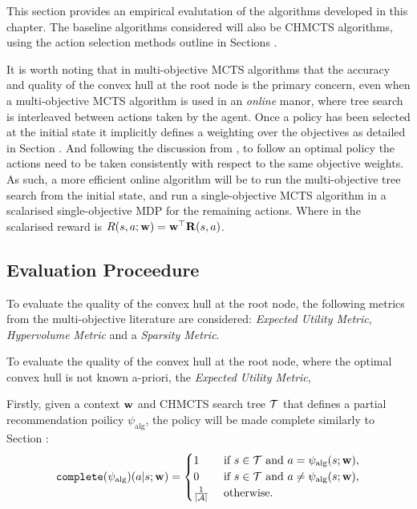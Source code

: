     This section provides an empirical evalutation of the algorithms developed in this chapter. The baseline algorithms considered will also be CHMCTS algorithms, using the action selection methods outline in Sections . 

     It is worth noting that in multi-objective MCTS algorithms that the accuracy and quality of the convex hull at the root node is the primary concern, even when a multi-objective MCTS algorithm is used in an \textit{online} manor, where tree search is interleaved between actions taken by the agent. Once a policy has been selected at the initial state it implicitly defines a weighting over the objectives as detailed in Section . And following the discussion from , to follow an optimal policy the actions need to be taken consistently with respect to the same objective weights. As such, a more efficient online algorithm will be to run the multi-objective tree search from the initial state, and run a single-objective MCTS algorithm in a scalarised single-objective MDP for the remaining actions. Where in the scalarised reward is $R(s,a;\mathbf{w}) = \mathbf{w}^\top \mathbf{R}(s,a)$.
    



    \subsection{Evaluation Proceedure} 

        To evaluate the quality of the convex hull at the root node, the following metrics from the multi-objective literature \cite{morl_survey} are considered: \textit{Expected Utility Metric}, \textit{Hypervolume Metric} and a \textit{Sparsity Metric}. 

        To evaluate the quality of the convex hull at the root node, where the optimal convex hull is not known a-priori, the \textit{Expected Utility Metric}, \textit{}

        Firstly, given a context $\mathbf{w}$ and CHMCTS search tree $\mathcal{T}$ that defines a partial recommendation poilicy $\psi_{\text{alg}}$, the policy will be made complete similarly to Section :
        \begin{align}
            \texttt{complete}(\psi_{\text{alg}})(a|s;\mathbf{w}) =
            \begin{cases}
                1                       & \text{ if } s\in\mathcal{T} \text{ and } a=\psi_{\text{alg}}(s;\mathbf{w}), \\
                0                       & \text{ if } s\in\mathcal{T} \text{ and } a\neq\psi_{\text{alg}}(s;\mathbf{w}), \\
                \frac{1}{|\mathcal{A}|}      & \text{ otherwise.}
            \end{cases} \label{eq:full_Recommend}
        \end{align}

